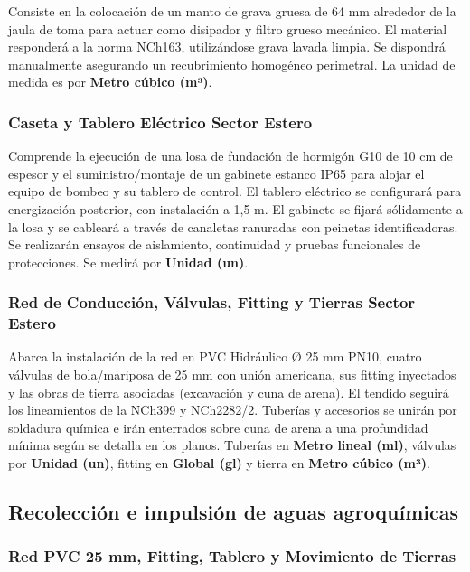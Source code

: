 Consiste en la colocación de un manto de grava gruesa de 64 mm alrededor de la jaula de toma para actuar como disipador y filtro grueso mecánico. El material responderá a la norma NCh163, utilizándose grava lavada limpia. Se dispondrá manualmente asegurando un recubrimiento homogéneo perimetral. La unidad de medida es por \textbf{Metro cúbico (m³)}.

\subsubsection*{Caseta y Tablero Eléctrico Sector Estero}

Comprende la ejecución de una losa de fundación de hormigón G10 de 10 cm de espesor y el suministro/montaje de un gabinete estanco IP65 para alojar el equipo de bombeo y su tablero de control. El tablero eléctrico se configurará para energización posterior, con instalación a 1,5 m. El gabinete se fijará sólidamente a la losa y se cableará a través de canaletas ranuradas con peinetas identificadoras. Se realizarán ensayos de aislamiento, continuidad y pruebas funcionales de protecciones. Se medirá por \textbf{Unidad (un)}.

\subsubsection*{Red de Conducción, Válvulas, Fitting y Tierras Sector Estero}

Abarca la instalación de la red en PVC Hidráulico Ø 25 mm PN10, cuatro válvulas de bola/mariposa de 25 mm con unión americana, sus fitting inyectados y las obras de tierra asociadas (excavación y cuna de arena). El tendido seguirá los lineamientos de la NCh399 y NCh2282/2. Tuberías y accesorios se unirán por soldadura química e irán enterrados sobre cuna de arena a una profundidad mínima según se detalla en los planos. Tuberías en \textbf{Metro lineal (ml)}, válvulas por \textbf{Unidad (un)}, fitting en \textbf{Global (gl)} y tierra en \textbf{Metro cúbico (m³)}.

\subsection{Recolección e impulsión de aguas agroquímicas}

\subsubsection*{Red PVC 25 mm, Fitting, Tablero y Movimiento de Tierras}

